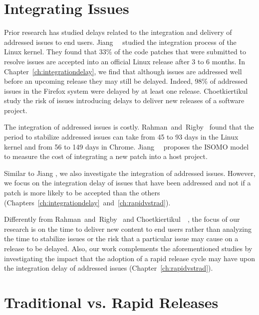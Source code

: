 \section{Integrating Issues} 

Prior research has studied delays related to the integration and delivery of addressed issues to end
users. Jiang~\etal~\cite{Jiang2013} studied the integration process of the Linux kernel. They found
that 33\% of the code patches that were submitted to resolve issues are accepted into an official
Linux release after 3 to 6 months. In Chapter~\ref{ch:integrationdelay}, we find that although
issues are addressed well before an upcoming release they may still be delayed. Indeed, 98\% of
addressed issues in the Firefox system were delayed by at least one release.
Choetkiertikul~\etal~\cite{riskyissues2015a,riskyissues2015b} study the risk of issues introducing
delays to deliver new releases of a software project.  

The integration of addressed issues is costly. Rahman~and~Rigby~\cite{rahmanrelease} found that the
period to stabilize addressed issues can take from 45 to 93 days in the Linux kernel and from 56 to
149 days in Chrome. Jiang~\etal~\cite{jiangmuch} proposes the ISOMO model to measure the cost of
integrating a new patch into a host project. 

Similar to Jiang \etal\cite{Jiang2013}, we also investigate the integration of addressed issues.
However, we focus on the integration delay of issues that have been addressed and not if a patch is
more likely to be accepted than the others
(Chapters~\ref{ch:integrationdelay}~and~\ref{ch:rapidvstrad}). 

Differently from Rahman~and~Rigby~\cite{rahmanrelease} and
Choetkiertikul~\etal~\cite{riskyissues2015a,riskyissues2015b}, the focus of our research is on the
time to deliver new content to end users rather than analyzing the time to stabilize issues or the
risk that a particular issue may cause on a release to be delayed.  Also, our work complements the
aforementioned studies by investigating the impact that the adoption of a rapid release cycle may
have upon the integration delay of addressed issues (Chapter~\ref{ch:rapidvstrad}).

\section{Traditional vs. Rapid Releases}

